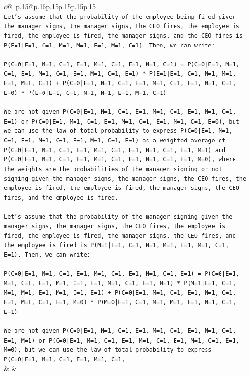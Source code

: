 \documentclass{article}
\begin{document}
{\begin{supertabular}{c@{$\;$}|p{.15\linewidth}@{}p{.15\linewidth}p{.15\linewidth}p{.15\linewidth}p{.15\linewidth}p{.15\linewidth}}
{{{\\ 
\texttt{Let's assume that the probability of the employee being fired given the manager signs, the manager signs, the CEO fires, the employee is fired, the employee is fired, the manager signs, and the CEO fires is P(E=1|E=1, C=1, M=1, M=1, E=1, M=1, C=1). Then, we can write:} \\
\\ 
\texttt{P(C=0|E=1, M=1, C=1, E=1, M=1, C=1, E=1, M=1, C=1) = P(C=0|E=1, M=1, C=1, E=1, M=1, C=1, E=1, M=1, C=1, E=1) * P(E=1|E=1, C=1, M=1, M=1, E=1, M=1, C=1) + P(C=0|E=1, M=1, C=1, E=1, M=1, C=1, E=1, M=1, C=1, E=0) * P(E=0|E=1, C=1, M=1, M=1, E=1, M=1, C=1)} \\
\\ 
\texttt{We are not given P(C=0|E=1, M=1, C=1, E=1, M=1, C=1, E=1, M=1, C=1, E=1) or P(C=0|E=1, M=1, C=1, E=1, M=1, C=1, E=1, M=1, C=1, E=0), but we can use the law of total probability to express P(C=0|E=1, M=1, C=1, E=1, M=1, C=1, E=1, M=1, C=1, E=1) as a weighted average of P(C=0|E=1, M=1, C=1, E=1, M=1, C=1, E=1, M=1, C=1, E=1, M=1) and P(C=0|E=1, M=1, C=1, E=1, M=1, C=1, E=1, M=1, C=1, E=1, M=0), where the weights are the probabilities of the manager signing or not signing given the manager signs, the manager signs, the CEO fires, the employee is fired, the employee is fired, the manager signs, the CEO fires, and the employee is fired.} \\
\\ 
\texttt{Let's assume that the probability of the manager signing given the manager signs, the manager signs, the CEO fires, the employee is fired, the employee is fired, the manager signs, the CEO fires, and the employee is fired is P(M=1|E=1, C=1, M=1, M=1, E=1, M=1, C=1, E=1). Then, we can write:} \\
\\ 
\texttt{P(C=0|E=1, M=1, C=1, E=1, M=1, C=1, E=1, M=1, C=1, E=1) = P(C=0|E=1, M=1, C=1, E=1, M=1, C=1, E=1, M=1, C=1, E=1, M=1) * P(M=1|E=1, C=1, M=1, M=1, E=1, M=1, C=1, E=1) + P(C=0|E=1, M=1, C=1, E=1, M=1, C=1, E=1, M=1, C=1, E=1, M=0) * P(M=0|E=1, C=1, M=1, M=1, E=1, M=1, C=1, E=1)} \\
\\ 
\texttt{We are not given P(C=0|E=1, M=1, C=1, E=1, M=1, C=1, E=1, M=1, C=1, E=1, M=1) or P(C=0|E=1, M=1, C=1, E=1, M=1, C=1, E=1, M=1, C=1, E=1, M=0), but we can use the law of total probability to express P(C=0|E=1, M=1, C=1, E=1, M=1, C=1,} \\
            }
        }
    }
    & & \\ \\


\end{supertabular}}
\end{document}
